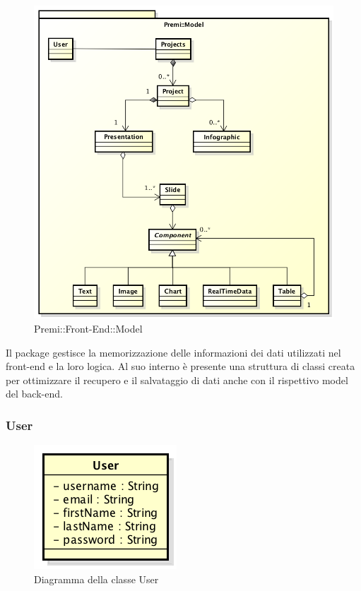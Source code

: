 \begin{figure}[h]
	\centering
	\includegraphics[width=0.7\linewidth]{img/premi_model}
	\caption[Premi::Front-End::Model]{Premi::Front-End::Model}
\end{figure}
Il package gestisce la memorizzazione delle informazioni dei dati utilizzati nel \gls{front-end} e la loro logica. Al suo interno è presente una struttura di classi creata per ottimizzare il recupero e il salvataggio di dati anche con il rispettivo model del \gls{back-end}.\\


\newpage


\subsubsection{User}

	\begin{figure}[h]
		\centering
		\includegraphics[width=0.4\linewidth]{img/premi_front_end_model_user}
		\caption[Diagramma della classe User]{Diagramma della classe User}
	\end{figure}
	
